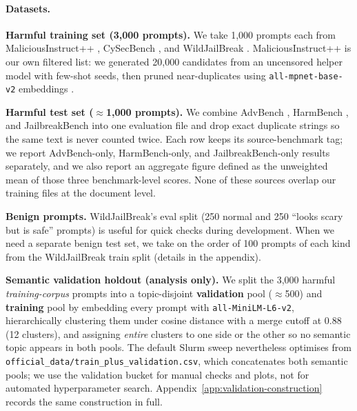 \documentclass{article}
\begin{document}
\paragraph{Datasets.}
\textbf{Harmful training set (3{,}000 prompts).} We take 1{,}000 prompts each from MaliciousInstruct++ \citep{huang2023maliciousinstruct}, CySecBench \citep{cysecbench2025}, and WildJailBreak \citep{jiang2024wildjailbreak}. MaliciousInstruct++ is our own filtered list: we generated 20{,}000 candidates from an uncensored helper model with few-shot seeds, then pruned near-duplicates using \texttt{all-mpnet-base-v2} embeddings \citep{reimers2019sbert}.

\textbf{Harmful test set ($\approx$1{,}000 prompts).} We combine AdvBench \citep{zou2023gcg}, HarmBench \citep{mazeika2024harmbench}, and JailbreakBench \citep{chao2024jailbreakbench} into one evaluation file and drop exact duplicate strings so the same text is never counted twice. Each row keeps its source-benchmark tag; we report AdvBench-only, HarmBench-only, and JailbreakBench-only results separately, and we also report an aggregate figure defined as the unweighted mean of those three benchmark-level scores. None of these sources overlap our training files at the document level.

\textbf{Benign prompts.} WildJailBreak's eval split (250 normal and 250 ``looks scary but is safe'' prompts) is useful for quick checks during development. When we need a separate benign test set, we take on the order of 100 prompts of each kind from the WildJailBreak train split (details in the appendix).

\textbf{Semantic validation holdout (analysis only).} We split the 3{,}000 harmful \emph{training-corpus} prompts into a topic-disjoint \textbf{validation} pool ($\approx$500) and \textbf{training} pool by embedding every prompt with \texttt{all-MiniLM-L6-v2}, hierarchically clustering them under cosine distance with a merge cutoff at $0.88$ (12 clusters), and assigning \emph{entire} clusters to one side or the other so no semantic topic appears in both pools. The default Slurm sweep nevertheless optimises from \texttt{official\_data/train\_plus\_validation.csv}, which concatenates both semantic pools; we use the validation bucket for manual checks and plots, not for automated hyperparameter search. Appendix~\ref{app:validation-construction} records the same construction in full.

\label{sec:exp-adversarial}
\end{document}
